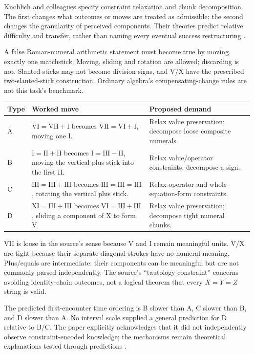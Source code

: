 Knoblich and colleagues specify constraint relaxation and chunk decomposition.
The first changes what outcomes or moves are treated as admissible;
the second changes the granularity of perceived components.
Their theories predict relative difficulty and transfer, rather than naming
every eventual success restructuring
\parencite[pp.~1534--1538]{KnoblichEtAl1999ConstraintsChunks}.

A false Roman-numeral arithmetic statement must become true by moving exactly
one matchstick. Moving, sliding and rotation are allowed; discarding is not.
Slanted sticks may not become division signs, and V/X have the prescribed
two-slanted-stick construction. Ordinary algebra's compensating-change rules
are not this task's benchmark.

\begin{tabularx}{\textwidth}{@{}l X X@{}}
\toprule Type & Worked move & Proposed demand\\ \midrule
A & \(\mathrm{VI}=\mathrm{VII}+\mathrm I\) becomes
\(\mathrm{VII}=\mathrm{VI}+\mathrm I\), moving one I. &
Relax value preservation; decompose loose composite numerals.\\
B & \(\mathrm I=\mathrm{II}+\mathrm{II}\) becomes
\(\mathrm I=\mathrm{III}-\mathrm{II}\), moving the vertical plus stick
into the first II. & Relax value/operator constraints; decompose a sign.\\
C & \(\mathrm{III}=\mathrm{III}+\mathrm{III}\) becomes
\(\mathrm{III}=\mathrm{III}=\mathrm{III}\), rotating the vertical plus stick. &
Relax operator and whole-equation-form constraints.\\
D & \(\mathrm{XI}=\mathrm{III}+\mathrm{III}\) becomes
\(\mathrm{VI}=\mathrm{III}+\mathrm{III}\), sliding a component of X to form V. &
Relax value preservation; decompose tight numeral chunks.\\
\bottomrule
\end{tabularx}

VII is loose in the source's sense because V and I remain meaningful units.
V/X are tight because their separate diagonal strokes have no numeral meaning.
Plus/equals are intermediate: their components can be meaningful but are
not commonly parsed independently. The source's
\enquote{tautology constraint} concerns avoiding identity-chain outcomes,
not a logical theorem that every \(X=Y=Z\) string is valid.

The predicted first-encounter time ordering is B slower than A, C slower than B,
and D slower than A. No interval scale supplied a general prediction for D
relative to B/C. The paper explicitly acknowledges that it did not independently
observe constraint-encoded knowledge; the mechanisms remain theoretical
explanations tested through predictions
\parencite[pp.~1535--1538, 1553]{KnoblichEtAl1999ConstraintsChunks}.

